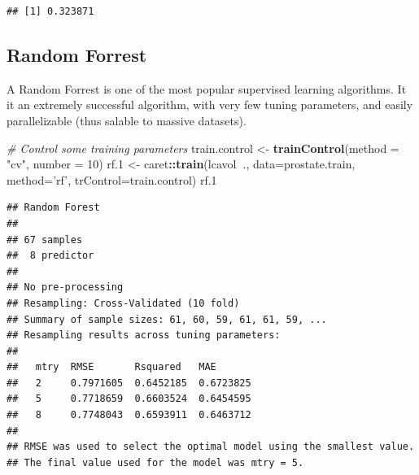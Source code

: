 \documentclass[]{book}
\newenvironment{Shaded}{\begin{snugshade}}{\end{snugshade}}
\newcommand{\CommentTok}[1]{\textcolor[rgb]{0.56,0.35,0.01}{\textit{#1}}}
\newcommand{\DataTypeTok}[1]{\textcolor[rgb]{0.13,0.29,0.53}{#1}}
\newcommand{\DecValTok}[1]{\textcolor[rgb]{0.00,0.00,0.81}{#1}}
\newcommand{\FloatTok}[1]{\textcolor[rgb]{0.00,0.00,0.81}{#1}}
\newcommand{\KeywordTok}[1]{\textcolor[rgb]{0.13,0.29,0.53}{\textbf{#1}}}
\newcommand{\NormalTok}[1]{#1}
\newcommand{\OperatorTok}[1]{\textcolor[rgb]{0.81,0.36,0.00}{\textbf{#1}}}
\newcommand{\StringTok}[1]{\textcolor[rgb]{0.31,0.60,0.02}{#1}}
\theoremstyle{definition}
\theoremstyle{definition}
\theoremstyle{definition}
\theoremstyle{remark}
\begin{document}
\begin{verbatim}
## [1] 0.323871
\end{verbatim}

\hypertarget{random-forrest}{%
\subsection{Random Forrest}\label{random-forrest}}

A Random Forrest is one of the most popular supervised learning algorithms.
It it an extremely successful algorithm, with very few tuning parameters, and easily parallelizable (thus salable to massive datasets).

\begin{Shaded}
\begin{Highlighting}[]
\CommentTok{# Control some training parameters}
\NormalTok{train.control <-}\StringTok{ }\KeywordTok{trainControl}\NormalTok{(}\DataTypeTok{method =} \StringTok{"cv"}\NormalTok{, }\DataTypeTok{number =} \DecValTok{10}\NormalTok{)}
\NormalTok{rf}\FloatTok{.1}\NormalTok{ <-}\StringTok{ }\NormalTok{caret}\OperatorTok{::}\KeywordTok{train}\NormalTok{(lcavol}\OperatorTok{~}\NormalTok{., }\DataTypeTok{data=}\NormalTok{prostate.train, }
                \DataTypeTok{method=}\StringTok{'rf'}\NormalTok{, }
                \DataTypeTok{trControl=}\NormalTok{train.control)}
\NormalTok{rf}\FloatTok{.1}
\end{Highlighting}
\end{Shaded}

\begin{verbatim}
## Random Forest 
## 
## 67 samples
##  8 predictor
## 
## No pre-processing
## Resampling: Cross-Validated (10 fold) 
## Summary of sample sizes: 61, 60, 59, 61, 61, 59, ... 
## Resampling results across tuning parameters:
## 
##   mtry  RMSE       Rsquared   MAE      
##   2     0.7971605  0.6452185  0.6723825
##   5     0.7718659  0.6603524  0.6454595
##   8     0.7748043  0.6593911  0.6463712
## 
## RMSE was used to select the optimal model using the smallest value.
## The final value used for the model was mtry = 5.
\end{verbatim}

\begin{Shaded}
\end{Shaded}
\end{document}
